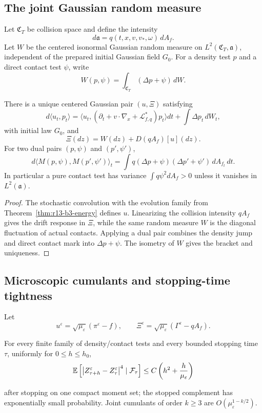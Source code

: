 \subsection{The joint Gaussian random measure}

Let $\mathfrak C_T$ be collision space and define the intensity
\[
 d\mathfrak a=q(t,x,v,v_*,\omega)\,dA_f.
\]
Let $W$ be the centered isonormal Gaussian random measure on
$L^2(\mathfrak C_T,\mathfrak a)$, independent of the prepared initial
Gaussian field $G_0$.  For a density test $p$ and a direct contact test
$\psi$, write
\[
 W(p,\psi)=\int_{\mathfrak C_T}(\Delta p+\psi)\,dW.
\]

\begin{theorem}
\label{thm:r13-b3-joint}
There is a unique centered Gaussian pair $(u,\Xi)$ satisfying
\[
 d\langle u_t,p_t\rangle
 =\langle u_t,(\partial_t+v\cdot\nabla_x
              +\mathcal L_{f,q}^*)p_t\rangle dt
 +\int\Delta p_t\,dW_t,
\]
with initial law $G_0$, and
\[
 \Xi(dz)=W(dz)+D(qA_f)[u](dz).
\]
For two dual pairs $(p,\psi)$ and $(p',\psi')$,
\[
 d\langle M(p,\psi),M(p',\psi')\rangle_t
 =\int q(\Delta p+\psi)(\Delta p'+\psi')\,dA_{f_t}\,dt.
\]
In particular a pure contact test has variance
$\int q\psi^2dA_f>0$ unless it vanishes in $L^2(\mathfrak a)$.
\end{theorem}

\begin{proof}
The stochastic convolution with the evolution family from
Theorem~\ref{thm:r13-b3-energy} defines $u$.  Linearizing the collision
intensity $qA_f$ gives the drift response in $\Xi$, while the same random
measure $W$ is the diagonal fluctuation of actual contacts.  Applying a dual
pair combines the density jump and direct contact mark into
$\Delta p+\psi$.  The isometry of $W$ gives the bracket and uniqueness.
\end{proof}

\subsection{Microscopic cumulants and stopping-time tightness}

Let
\[
 u^\varepsilon=
 \sqrt{\mu_\varepsilon}(\pi^\varepsilon-f),
 \qquad
 \Xi^\varepsilon=
 \sqrt{\mu_\varepsilon}(\Gamma^\varepsilon-qA_f).
\]

\begin{lemma}
\label{lem:r13-b3-cumulants}
For every finite family of density/contact tests and every bounded stopping
time $\tau$, uniformly for $0\le h\le h_0$,
\[
 \mathbb E\left[
 \left|Z_{\tau+h}^\varepsilon-Z_\tau^\varepsilon\right|^4
 \mid\mathcal F_\tau\right]
 \le C\left(h^2+{h\over\mu_\varepsilon}\right)
\]

after stopping on one compact moment set; the stopped complement has
exponentially small probability.  Joint cumulants of order $k\ge3$ are
$O(\mu_\varepsilon^{1-k/2})$.
\end{lemma}

